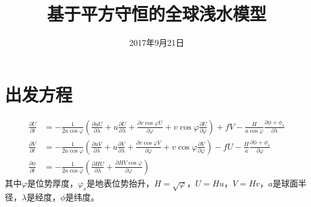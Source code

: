 \documentclass{ctexart}
\title{基于平方守恒的全球浅水模型}
\date{2017年9月21日}
\begin{document}
\maketitle

\section{出发方程}

\begin{align}
	\frac{\partial U}{\partial t} & = - \frac{1}{2 a \cos{\varphi}} \left( \frac{\partial u U}{\partial \lambda} + u \frac{\partial U}{\partial \lambda} + \frac{\partial v \cos{\varphi} U}{\partial \varphi} + v \cos{\varphi} \frac{\partial U}{\partial \varphi} \right) + f V - \frac{H}{a \cos{\varphi}} \frac{\partial \phi + \phi_s}{\partial \lambda} \\
  \frac{\partial V}{\partial t} & = - \frac{1}{2 a \cos{\varphi}} \left( \frac{\partial u V}{\partial \lambda} + u \frac{\partial V}{\partial \lambda} + \frac{\partial v \cos{\varphi} V}{\partial \varphi} + v \cos{\varphi} \frac{\partial V}{\partial \varphi} \right) - f U - \frac{H}{a} \frac{\partial \phi + \phi_s}{\partial \varphi} \\
  \frac{\partial \phi}{\partial t} & = - \frac{1}{2 a \cos{\varphi}} \left( \frac{\partial H U}{\partial \lambda} + \frac{\partial H V \cos{\varphi}}{\partial \varphi} \right)
\end{align}
其中$\varphi$是位势厚度，$\varphi_s$是地表位势抬升，$H = \sqrt{\varphi}$，$U = H u$，$V = H v$，$a$是球面半径，$\lambda$是经度，$\phi$是纬度。
\end{document}
